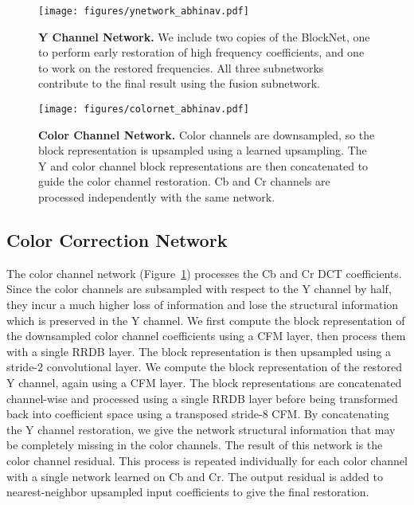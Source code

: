 \documentclass[runningheads]{llncs}
\begin{document}
\begin{figure}[t]
    \begin{minipage}[t]{0.43\linewidth}
        \centering
        \texttt{[image: figures/ynetwork\_abhinav.pdf]}
        \caption{\textbf{Y Channel Network.} We include two copies of the BlockNet, one to perform early restoration of
        high frequency coefficients, and one to work on the restored frequencies. All three
        subnetworks contribute to the final result using the fusion subnetwork.}
        \label{fig:ychannel}
    \end{minipage}
\hfill
    \begin{minipage}[t]{0.54\linewidth}
        \centering
        \texttt{[image: figures/colornet\_abhinav.pdf]}
        \caption{\textbf{Color Channel Network.} Color channels are downsampled, so the block representation is upsampled using a learned upsampling. 
        The Y and color channel block representations are then concatenated to guide the color channel restoration. Cb and Cr channels are processed independently with the
        same network.}
        \label{fig:color}
    \end{minipage}
\end{figure}

\subsection{Color Correction Network}
\label{sec:app:c}
The color channel network (Figure~\ref{fig:color}) processes the Cb and Cr DCT coefficients. Since the color channels are subsampled with respect to the Y channel by half, they incur a much higher loss of information and lose the structural information which is preserved in the Y channel. We first compute the block representation of the downsampled color channel coefficients using a CFM layer, then process them with a single RRDB layer. The block representation is then upsampled using a  stride-2  convolutional layer. We compute the block representation of the restored Y channel, again using a CFM layer. The block representations are concatenated channel-wise and processed using a single RRDB layer before being transformed back into coefficient space using a transposed  stride-8 CFM. By concatenating the Y channel restoration, we give the network structural information that may be completely missing in the color channels. The result of this network is the color channel residual. This process is repeated individually for each color channel with a single network learned on Cb and Cr. The output residual is added to nearest-neighbor upsampled input coefficients to give the final restoration.
\end{document}
